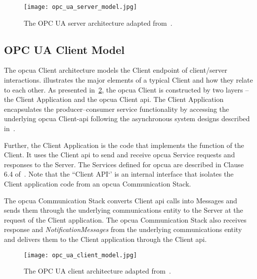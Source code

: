 \documentclass[
a4paper,
twoside,
headsepline,
cleardoublepage=empty,
parskip=half,
draft=false
]{scrbook}
\begin{document}
				\begin{figure}[htbp]
					\centering
					\texttt{[image: opc\_ua\_server\_model.jpg]}
					\caption{The OPC UA server architecture adapted from~\cite{opcfoundation2017part1}.}
					\label{fig:opc_ua_server_model}
				\end{figure}

			\subsection{OPC UA Client Model}\label{subsec:opc_ua_client_model}

				The \gls{opcua} Client architecture models the Client endpoint of client/server interactions.
				 illustrates the major elements of a typical Client and how they relate to each other.
				As presented in~\cref{fig:opc_ua_client_model}, the \gls{opcua} Client is constructed by two layers -- the Client Application and the \gls{opcua} Client \gls{api}. The Client Application encapsulates the producer–consumer service functionality by accessing the underlying \gls{opcua} Client-\gls{api} following the asynchronous system designs described in~\cite{tanenbaum2007distributed}.
				
				Further, the Client Application is the code that implements the function of the Client.
				It uses the Client \gls{api} to send and receive \gls{opcua} Service requests and responses to the Server.
				The Services defined for \gls{opcua} are described in Clause 6.4 of~\cite{opcfoundation2017part4}.
				Note that the ``Client API`' is an internal interface that isolates the Client application code from an \gls{opcua} Communication Stack.
				
				The \gls{opcua} Communication Stack converts Client \gls{api} calls into Messages and sends them through the underlying communications entity to the Server at the request of the Client application.
				The \gls{opcua} Communication Stack also receives response and \textit{NotificationMessages} from the underlying communications entity and delivers them to the Client application through the Client \gls{api}.

				\begin{figure}[htbp]
					\centering
					\texttt{[image: opc\_ua\_client\_model.jpg]}
					\caption{The OPC UA client architecture adapted from~\cite{opcfoundation2017part1}.}
					\label{fig:opc_ua_client_model}
				\end{figure}
\end{document}
